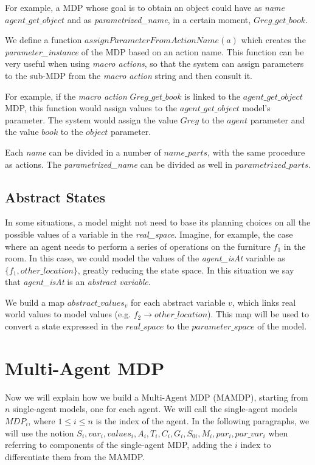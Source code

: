 For example, a MDP whose goal is to obtain an object could have as \textit{name} $agent\_get\_object$ and as \textit{parametrized\_name}, in a certain moment, $Greg\_get\_book$.

We define a function $assignParameterFromActionName(a)$ which creates the \textit{parameter\_instance} of the MDP based on an action name. This function can be very useful when using \textit{macro actions}, so that the system can assign parameters to the sub-MDP from the \textit{macro action} string and then consult it.

For example, if the \textit{macro action} $Greg\_get\_book$ is linked to the $agent\_get\_object$ MDP, this function would assign values to the  $agent\_get\_object$ model's parameter. The system would assign the value $Greg$ to the $agent$ parameter and the value $book$ to the $object$ parameter. 

Each \textit{name} can be divided in a number of $name\_parts$,  with the same procedure as actions. The \textit{parametrized\_name} can be divided as well in $parametrized\_parts$.


\subsection{Abstract States}

In some situations, a model might not need to base its planning choices on all the possible values of a variable in the \textit{real\_space}. Imagine, for example, the case where an agent needs to perform a series of operations on the furniture $f_1$ in the room. In this case, we could model the  values of the \textit{agent\_isAt} variable as $\{f_1 , other\_location\}$, greatly reducing the state space. In this situation we say that \textit{agent\_isAt} is an \textit{abstract variable}. 

We build a map $abstract\_values_v$ for each abstract variable $v$, which links real world values to model values (e.g. $f_2 \rightarrow other\_location$). This map will be used to convert a state expressed in the $real\_space$ to the $parameter\_space$ of the model. 

\section{Multi-Agent MDP}
\label{sec:mamdp-mamdp}
Now we will explain how we build a Multi-Agent MDP (MAMDP), starting from $n$ single-agent models, one for each agent. We will call the single-agent models $MDP_i$, where $1 \leq i \leq n $ is the index of the agent. In the following paragraphs, we will use the notion $S_i, var_i, values_i, A_i, T_i, C_i, G_i, S_{0i}, M_i, par_i, par\_var_i$ when referring to components of the single-agent MDP, adding the $i$ index to differentiate them from the MAMDP. 
 
